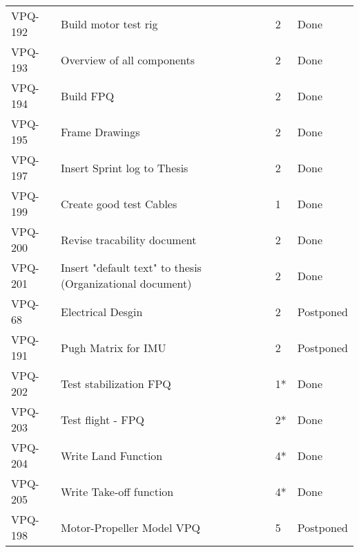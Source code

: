 \begin{table}[ht]
\begin{tabularx}{\linewidth}{|m{1.5cm} m{8.3cm} m{1.5cm} m{3.5cm}|}
\rowcolor{gainsboro} VPQ-192 & Build motor test rig & 2\centering & Done  \\    
      VPQ-193 & Overview of all components & 2\centering & Done  \\
\rowcolor{gainsboro}  VPQ-194 & Build FPQ & 2\centering & Done  \\
      VPQ-195 & Frame Drawings & 2\centering & Done  \\
\rowcolor{gainsboro} VPQ-197 & Insert Sprint log to Thesis & 2\centering & Done  \\
      VPQ-199 & Create good test Cables & 1\centering & Done  \\
\rowcolor{gainsboro} VPQ-200 & Revise tracability document & 2\centering & Done  \\    
      VPQ-201 & Insert "default text" to thesis (Organizational document) & 2\centering & Done  \\
\rowcolor{gainsboro}  VPQ-68 &  Electrical Desgin & 2\centering & Postponed  \\
      VPQ-191 & Pugh Matrix for IMU & 2\centering & Postponed  \\
\rowcolor{gainsboro} VPQ-202 &  Test stabilization FPQ & 1*\centering & Done  \\
      VPQ-203 & Test flight - FPQ & 2*\centering & Done \\
\rowcolor{gainsboro} VPQ-204 & Write Land Function & 4*\centering & Done  \\    
      VPQ-205 & Write Take-off function & 4*\centering & Done  \\
\rowcolor{gainsboro}  VPQ-198 & Motor-Propeller Model VPQ & 5\centering & Postponed  \\

\hline    
\end{tabularx}
\end{table}


